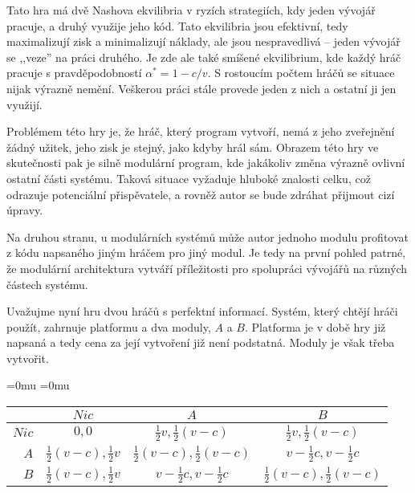 \begin{multicols}{2}
		Tato hra má dvě Nashova ekvilibria v ryzích strategiích, kdy jeden vývojář pracuje, a druhý využije jeho kód. Tato ekvilibria jsou efektivní, tedy maximalizují zisk a minimalizují náklady, ale jsou nespravedlivá -- jeden vývojář se ,,veze'' na práci druhého. Je zde ale také smíšené ekvilibrium, kde  každý hráč pracuje s pravděpodobností $\alpha^* = 1-c/v$. S rostoucím počtem hráčů se situace nijak výrazně nemění. Veškerou práci stále provede jeden z nich a ostatní ji jen využijí.

		Problémem této hry je, že hráč, který program vytvoří, nemá z jeho zveřejnění žádný užitek, jeho zisk je stejný, jako kdyby hrál sám. Obrazem této hry ve skutečnosti pak je silně modulární program, kde jakákoliv změna výrazně ovlivní ostatní části systému. Taková situace vyžaduje hluboké znalosti celku, což odrazuje potenciální přispěvatele, a rovněž autor se bude zdráhat přijmout cizí úpravy.

		Na druhou stranu, u modulárních systémů může autor jednoho modulu profitovat z kódu napsaného jiným hráčem pro jiný modul. Je tedy na první pohled patrné, že modulární architektura vytváří příležitosti pro spolupráci vývojářů na různých částech systému.

		Uvažujme nyní hru dvou hráčů s perfektní informací. Systém, který chtějí hráči použít, zahrnuje platformu a dva moduly, $A$ a $B$. Platforma je v době hry již napsaná a tedy cena za její vytvoření již není podstatná. Moduly je však třeba vytvořit.


			\begin{Figure}
			\begin{center}
			\begingroup
			\medmuskip=0mu
			\thickmuskip=0mu
				\makeatletter\def\f@size{8}
			\hskip-0.7cm
			\begin{tabular}{r| c c c}
					& $Nic$ & $A$ & $B$ \\
					\hline
				$Nic$ &
				 	$0,0$ &
					$\frac{1}{2}v, \frac{1}{2}(v-c)$ &
					$\frac{1}{2}v, \frac{1}{2}(v-c)$ \\
				$A$ &
					$\frac{1}{2}(v-c), \frac{1}{2}v$ &
					$\frac{1}{2}(v-c), \frac{1}{2}(v-c)$ &
					\cellcolor{gray!20}$v-\frac{1}{2}c, v-\frac{1}{2}c$ \\
				$B$ &
					$\frac{1}{2}(v-c), \frac{1}{2}v$ &
					\cellcolor{gray!20}$v-\frac{1}{2}c, v-\frac{1}{2}c$ &
					$\frac{1}{2}(v-c), \frac{1}{2}(v-c)$ \\
			\end{tabular}
			\endgroup
			\end{center}
			\label{tab:involuntary-altruism-modules-perfect-information}
			\end{Figure}


\end{multicols}
